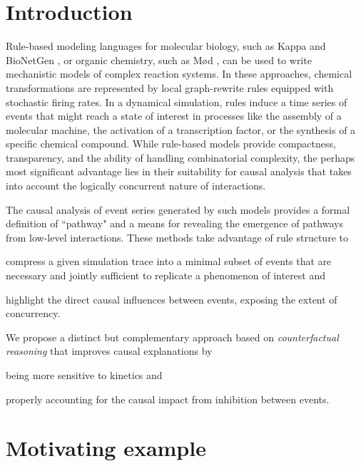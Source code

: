 
\section*{Introduction}\label{sec:intro}

Rule-based modeling languages for molecular biology, such as Kappa
\cite{DanosEtAl-CONCUR07} and BioNetGen \cite{bngl}, or organic
chemistry, such as M{\o}d \cite{moll}, can be used to write
mechanistic models of complex reaction systems. In these approaches,
chemical transformations are represented by local graph-rewrite rules
equipped with stochastic firing rates. In a dynamical simulation,
rules induce a time series of events that might reach a state of
interest in processes like the assembly of a molecular machine, the
activation of a transcription factor, or the synthesis of a specific
chemical compound. While rule-based models provide compactness,
transparency, and the ability of handling combinatorial complexity,
the perhaps most significant advantage lies in their suitability for
causal analysis that takes into account the logically concurrent
nature of interactions.

The causal analysis
\cite{DBLP:conf/fsttcs/DanosFFHH12,DanosEtAl-CONCUR07} of event series
generated by such models provides a formal definition of ``pathway"
and a means for revealing the emergence of pathways from low-level
interactions. These methods take advantage of rule structure to
\begin{inparaenum}[(i)]
\item compress a given simulation trace into a minimal subset of
  events that are necessary and jointly sufficient to replicate a
  phenomenon of interest and
\item highlight the direct causal influences between events, exposing
  the extent of concurrency.
\end{inparaenum}


We propose a distinct but complementary approach based on
\textit{counterfactual reasoning} that improves causal explanations by
\begin{inparaenum}[(i)]
\item being more sensitive to kinetics and
\item properly accounting for the causal impact from inhibition
  between events.
\end{inparaenum}

\section{Motivating example}\label{sec:example}

